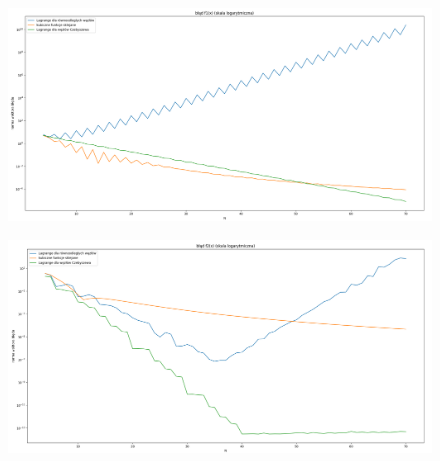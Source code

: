\documentclass{article}
\begin{document}
	
	\begin{figure}[h]
    		\centering
  		\includegraphics[scale = 0.3]{wykres2.png}
	\end{figure}
	
	\begin{figure}[h]
    		\centering
  		\includegraphics[scale = 0.3]{wykres3.png}
	\end{figure}
	
	
	
	
	
	
	
	
	
	
	
	
	
	
	
	
	
	
	
	
	
	
	
	
	
	
\end{document}

